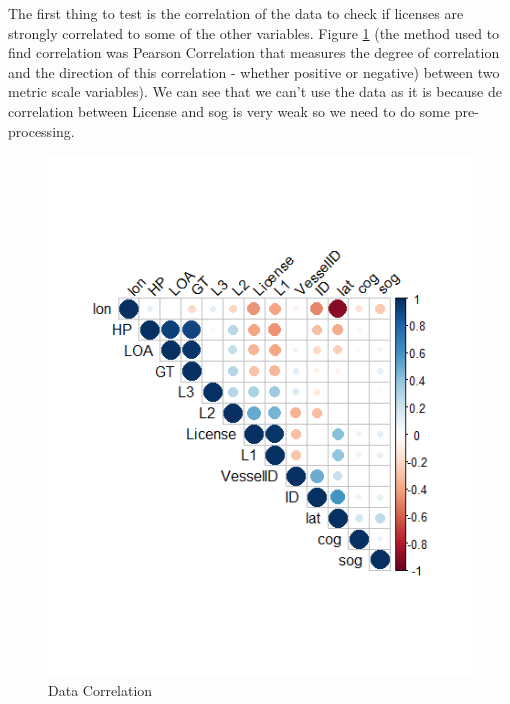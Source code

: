 

The first thing to test is the correlation of the data to check if licenses are strongly correlated to some of the other variables. Figure \ref{fig:data_coor1} (the method used to find correlation was Pearson Correlation \cite{Benesty2009} that measures the degree of correlation and the direction of this correlation - whether positive or negative) between two metric scale variables). We can see that we can’t use the data as it is because de correlation between License and sog is very weak so we need to do some pre-processing.
\begin{figure}[h]
    \centering
    \includegraphics[width=0.7\linewidth]{Chapters/img/data_coor1.png}
    \caption{Data Correlation}
    \label{fig:data_coor1}
\end{figure}




